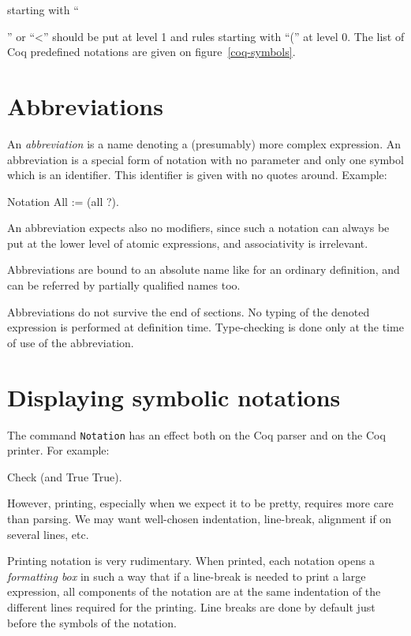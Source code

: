 starting with ``{'' or ``<'' should be put at level 1 and rules
starting with ``('' at level 0. The list of Coq predefined notations
are given on figure~\ref{coq-symbols}.

\section{Abbreviations}
\label{Abbreviations}

An {\em abbreviation} is a name denoting a (presumably) more complex
expression. An abbreviation is a special form of notation with no
parameter and only one symbol which is an identifier. This identifier
is given with no quotes around. Example:

\begin{coq_example*}
Notation All := (all ?).
\end{coq_example*}

An abbreviation expects also no modifiers, since such a notation can
always be put at the lower level of atomic expressions, and
associativity is irrelevant.

Abbreviations are bound to an absolute name like for an ordinary
definition, and can be referred by partially qualified names too.

Abbreviations do not survive the end of sections. No typing of the denoted
expression is performed at definition time. Type-checking is done only
at the time of use of the abbreviation.

\section{Displaying symbolic notations}

The command \texttt{Notation} has an effect both on the Coq parser and
on the Coq printer. For example:

\begin{coq_example}
Check (and True True).
\end{coq_example}

However, printing, especially when we expect it to be pretty, requires
more care than parsing. We may want well-chosen indentation,
line-break, alignment if on several lines, etc. 

Printing notation is very rudimentary. When printed, each notation
opens a {\em formatting box} in such a way that if a line-break is
needed to print a large expression, all components of the notation are
at the same indentation of the different lines required for the
printing.  Line breaks are done by default just before the symbols of
the notation.

}

